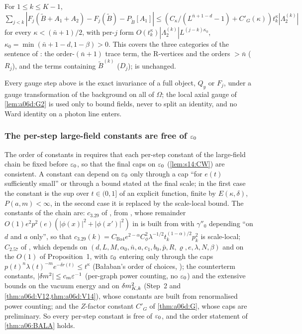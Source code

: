 \begin{corollary}\label{cor:a06d:G}
For $1\le k\le K-1$, $\sum_{j<k}|F_j(\tilde B+A_1+A_2)-F_j(\tilde B)-P_{\tilde B}[A_1]|\le(C_\kappa/(L^{\bar n+1-d}-1)+C'_G(\kappa))t_k^\kappa|\Lambda^{(k)}_2|$ for every $\kappa<(\bar n+1)/2$, with per-$j$ form $O(t_k^\kappa)|\Lambda^{(k)}_2|L^{(j-k)\kappa_0}$, $\kappa_0=\min(\bar n+1-d,1-\beta)>0$. This covers the three categories of the sentence of \cite[p.~578]{Ba2}: the order-$(\bar n+1)$ trace term, the R-vertices and the orders $>\bar n$ ($R_j$), and the terms containing $\tilde B^{(k)}$ ($D_j$); \cite[(2.104)]{Ba2} is unchanged.
\end{corollary}

Every gauge step above is the exact invariance of a full object, $Q_y$ or $F_j$, under a gauge transformation of the background on all of $\Omega$; the local axial gauge of \cref{lem:a06d:G2} is used only to bound fields, never to split an identity, and no Ward identity on a photon line enters.

\subsubsection*{The per-step large-field constants are free of $\varepsilon_0$}

The order of constants in \cite[Sect.~3]{Ba2} requires that each per-step constant of the large-field chain be fixed before $\varepsilon_0$, so that the final caps on $\varepsilon_0$ (\cref{lem:s14:CW}) are consistent. A constant can depend on $\varepsilon_0$ only through a cap ``for $e(t)$ sufficiently small'' or through a bound stated at the final scale; in the first case the constant is the sup over $t\in(0,1]$ of an explicit function, finite by $E(\kappa,\delta)$, $P(a,m)<\infty$, in the second case it is replaced by the scale-local bound. The constants of the chain are: $c_{3.29}$ of \cite[(3.29)]{Ba2}, from \cite[Prop.~3.1$'$, Sect.~4]{Ba4}, whose remainder $O(1)e^2p^2(e)(|\phi(x)|^2+|\phi(x')|^2)$ in \cite[(4.7)]{Ba4} is built from \cite[Lemma~2.1, (4.10), (4.13), (4.22)]{Ba4} with $\gamma''_0$ depending ``on $d$ and $a$ only'', so that $c_{3.29}(k)=C_{\mathrm{Ba4}}e^{2-\alpha}C_\phi^2\lambda^{-1/2}t_k^{(1-\alpha)/2}p_k^2$ is scale-local; $C_{2.57}$ of \cite[(2.57)]{Ba2}, which depends on $(d,L,M,\alpha_0,\bar n,a,c_1,b_0,\bar p,R,\varrho,e,\lambda,N,\beta)$ and on the $O(1)$ of Proposition~1, with $\varepsilon_0$ entering only through the caps $p(t)^n\lambda(t)^{-m}e^{-\delta r(t)}\le t^\kappa$ (Ba{\l}aban's order of choices, \cite[p.~421]{Ba3}); the counterterm constants, $|\delta m^2|\le c_m\varepsilon^{-1}$ (per-graph power counting, no $\varepsilon_0$) and the extensive bounds on the vacuum energy and on $\delta m^2_{K,k}$ (Step~2 and \cref{thm:a06d:V12,thm:a06d:V14}), whose constants are built from renormalised power counting; and the $Z$-factor constant $C'_G$ of \cref{thm:a06d:G}, whose caps are preliminary. So every per-step constant is free of $\varepsilon_0$, and the order statement of \cref{thm:a06:BALA} holds.

